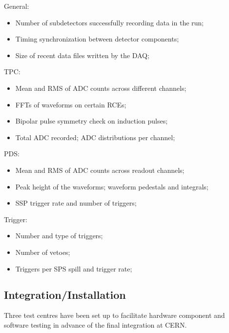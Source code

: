 General:
\begin{itemize}
\item{Number of subdetectors successfully recording data in the run;}
\item{Timing synchronization between detector components;}
\item{Size of recent data files written by the DAQ;}
\end{itemize}
  TPC:
\begin{itemize}
\item{Mean and RMS of ADC counts across different channels;}
\item{FFTs of waveforms on certain RCEs;}
\item{Bipolar pulse symmetry check on induction pulses;}
\item{Total ADC recorded; ADC distributions per channel;}
\end{itemize}
  PDS:
\begin{itemize}
\item{Mean and RMS of ADC counts across readout channels;}
\item{Peak height of the waveforms; waveform pedestals and integrals;}
\item{SSP trigger rate and number of triggers;}
\end{itemize}
  Trigger:
\begin{itemize}
\item{Number and type of triggers;}
\item{Number of vetoes;}
\item{Triggers per SPS spill and trigger rate;}
\end{itemize}



\subsection{Integration/Installation}

Three test centres have been set up to facilitate hardware component and 
software testing in advance of the final integration at CERN.  
